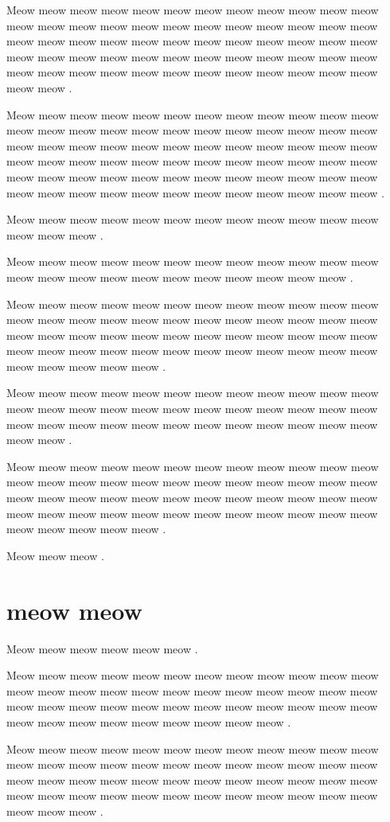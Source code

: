 \documentclass[12pt, a5paper, openany]{book}
\begin{document}
Meow meow meow meow meow meow meow meow meow meow meow meow meow meow meow meow meow meow meow meow meow meow meow meow meow meow meow meow meow meow meow meow meow meow meow meow meow meow meow meow meow meow meow meow meow meow meow meow meow meow meow meow meow meow meow meow meow meow meow meow meow meow .

Meow meow meow meow meow meow meow meow meow meow meow meow meow meow meow meow meow meow meow meow meow meow meow meow meow meow meow meow meow meow meow meow meow meow meow meow meow meow meow meow meow meow meow meow meow meow meow meow meow meow meow meow meow meow meow meow meow meow meow meow meow meow meow meow meow meow meow meow meow meow meow meow .

Meow meow meow meow meow meow meow meow meow meow meow meow meow meow meow .

Meow meow meow meow meow meow meow meow meow meow meow meow meow meow meow meow meow meow meow meow meow meow meow .

Meow meow meow meow meow meow meow meow meow meow meow meow meow meow meow meow meow meow meow meow meow meow meow meow meow meow meow meow meow meow meow meow meow meow meow meow meow meow meow meow meow meow meow meow meow meow meow meow meow meow meow meow meow .

Meow meow meow meow meow meow meow meow meow meow meow meow meow meow meow meow meow meow meow meow meow meow meow meow meow meow meow meow meow meow meow meow meow meow meow meow meow meow .

Meow meow meow meow meow meow meow meow meow meow meow meow meow meow meow meow meow meow meow meow meow meow meow meow meow meow meow meow meow meow meow meow meow meow meow meow meow meow meow meow meow meow meow meow meow meow meow meow meow meow meow meow meow .

Meow meow meow .



\chapter{meow meow }Meow meow meow meow meow meow .

Meow meow meow meow meow meow meow meow meow meow meow meow meow meow meow meow meow meow meow meow meow meow meow meow meow meow meow meow meow meow meow meow meow meow meow meow meow meow meow meow meow meow meow meow meow .

Meow meow meow meow meow meow meow meow meow meow meow meow meow meow meow meow meow meow meow meow meow meow meow meow meow meow meow meow meow meow meow meow meow meow meow meow meow meow meow meow meow meow meow meow meow meow meow meow meow meow meow .
\end{document}
